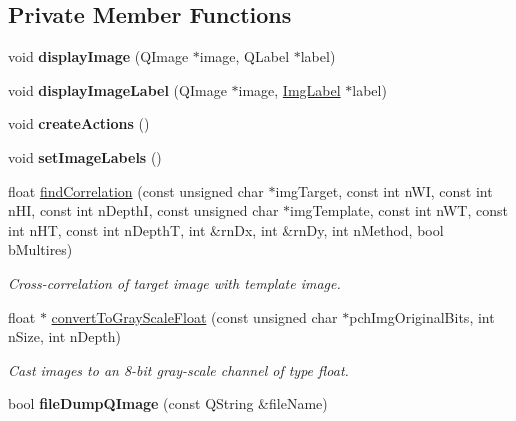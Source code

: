 \subsection*{Private Member Functions}
\begin{DoxyCompactItemize}
\item 
\hypertarget{classQcorr_a925b0715143a0afa981851547f8b9256}{
void {\bfseries displayImage} (QImage $\ast$image, QLabel $\ast$label)}
\label{classQcorr_a925b0715143a0afa981851547f8b9256}

\item 
\hypertarget{classQcorr_afddb022a6024a32be3b47016308d6c50}{
void {\bfseries displayImageLabel} (QImage $\ast$image, \hyperlink{classImgLabel}{ImgLabel} $\ast$label)}
\label{classQcorr_afddb022a6024a32be3b47016308d6c50}

\item 
\hypertarget{classQcorr_a54af608880477563fa8ebcb0d066b447}{
void {\bfseries createActions} ()}
\label{classQcorr_a54af608880477563fa8ebcb0d066b447}

\item 
\hypertarget{classQcorr_a17beb7cf946cdd82f587e3b4e5ee7f19}{
void {\bfseries setImageLabels} ()}
\label{classQcorr_a17beb7cf946cdd82f587e3b4e5ee7f19}

\item 
float \hyperlink{classQcorr_aa867dbbe79fe720631216eec154a12e2}{findCorrelation} (const unsigned char $\ast$imgTarget, const int nWI, const int nHI, const int nDepthI, const unsigned char $\ast$imgTemplate, const int nWT, const int nHT, const int nDepthT, int \&rnDx, int \&rnDy, int nMethod, bool bMultires)
\begin{DoxyCompactList}\small\item\em Cross-\/correlation of target image with template image. \item\end{DoxyCompactList}\item 
float $\ast$ \hyperlink{classQcorr_ad1b26ace597c0c4a0f64a0bd9576d4fc}{convertToGrayScaleFloat} (const unsigned char $\ast$pchImgOriginalBits, int nSize, int nDepth)
\begin{DoxyCompactList}\small\item\em Cast images to an 8-\/bit gray-\/scale channel of type float. \item\end{DoxyCompactList}\item 
\hypertarget{classQcorr_a87229fc918fa4011e96fbadb325fd52e}{
bool {\bfseries fileDumpQImage} (const QString \&fileName)}
\label{classQcorr_a87229fc918fa4011e96fbadb325fd52e}

\end{DoxyCompactItemize}
